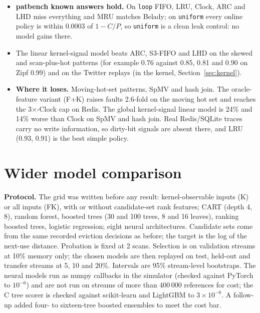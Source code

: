 \documentclass[10.5pt,a4paper]{article}
\newcommand{\code}[1]{\texttt{#1}}
\newcommand{\best}[1]{\textbf{\textcolor{good}{#1}}}
\begin{document}
\begin{itemize}
\item \best{patbench known answers hold.} On \code{loop} FIFO, LRU, Clock, ARC and LHD miss everything and MRU
  matches Belady; on \code{uniform} every online policy is within 0.0003 of $1-C/P$, so \code{uniform} is a clean
  leak control: no model gains there.
\item The linear kernel-signal model beats ARC, S3-FIFO and LHD on the skewed and scan-plus-hot patterns
  (for example 0.76 against 0.85, 0.81 and 0.90 on Zipf 0.99) and on the Twitter replays (in the kernel, Section~\ref{sec:kernel}).
\item \textbf{Where it loses.} Moving-hot-set patterns, SpMV and hash join. The oracle-feature variant (F+K)
  raises faults 2.6-fold on the moving hot set and reaches the 3$\times$-Clock cap on Redis. The global kernel-signal linear model is 24\% and 14\%
  worse than Clock on SpMV and hash join. Real Redis/SQLite traces carry no write information, so dirty-bit
  signals are absent there, and LRU (0.93, 0.91) is the best simple policy.
\end{itemize}

\begin{table}[h]
\centering\scriptsize

\caption{Faults / Clock per stream group (geometric mean over streams and the three memory sizes). Simulator results; the three last columns are linear models (global kernel signals, global oracle+kernel signals, kv-scope kernel signals).}
\end{table}

\section{Wider model comparison}

\textbf{Protocol.} The grid was written before any result: kernel-observable inputs (K) or all inputs (FK),
with or without candidate-set rank features; CART (depth 4, 8), random forest, boosted trees (30 and 100 trees,
8 and 16 leaves), ranking boosted trees, logistic regression; eight neural architectures. Candidate
sets come from the same recorded eviction decisions as before; the target is the log of the next-use distance.
Probation is fixed at 2 scans. Selection is on validation streams at 10\% memory only; the chosen models are
then replayed on test, held-out and transfer streams at 5, 10 and 20\%. Intervals are 95\% stream-level
bootstraps. The neural models run as numpy callbacks in the simulator (checked against PyTorch to $10^{-6}$)
and are not run on streams of more than 400\,000 references for cost; the C tree scorer is checked against
scikit-learn and LightGBM to $3\times10^{-6}$. A follow-up added four- to sixteen-tree boosted ensembles to
meet the cost bar.
\end{document}
